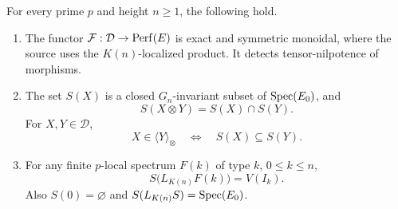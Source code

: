 \begin{proposition}\label{fin:support}
For every prime \(p\) and height \(n\ge1\), the following hold.
\begin{enumerate}
\item The functor
\(\mathcal F:\mathcal D\to\operatorname{Perf}(E)\) is exact and symmetric monoidal,
where the source uses the \(K(n)\)-localized product.
It detects tensor-nilpotence of morphisms.
\item The set \(S(X)\) is a closed \(G_n\)-invariant subset
of \(\operatorname{Spec}(E_0)\), and
\[
 S(X\otimes Y)=S(X)\cap S(Y).
\]
For \(X,Y\in\mathcal D\),
\[
  X\in\langle Y\rangle_\otimes
       \quad\Longleftrightarrow\quad
  S(X)\subseteq S(Y).
\]
\item For any finite \(p\)-local spectrum \(F(k)\) of type \(k\),
\(0\le k\le n\),
\[
  S\bigl(L_{K(n)}F(k)\bigr)=V(I_k).
\]
Also \(S(0)=\varnothing\) and
\(S(L_{K(n)}S)=\operatorname{Spec}(E_0)\).
\end{enumerate}
\end{proposition}

